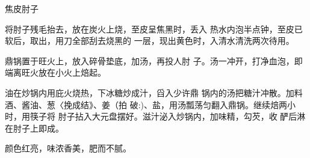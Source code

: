 \begin{recipe}{焦皮肘子}

\ingredients



\cooking

\step 将肘子残毛抬去，放在炭火上烧，至皮呈焦黑时，丢入 热水内泡半点钟，至皮已软后，取出，用刀全部刮去烧黑的 一层，现出黄色时，入清水清洗两次待用。

\step 鼎锅置于旺火上，放入碎骨垫底，加汤，再投人肘 子。汤一冲开，打净血泡，即端离旺火放在小火上焙起。

油在炒锅内用庇火烧热，下冰糖炒成汁，舀入少许鼎 锅内的汤把糖汁冲散。加料酒、酱油、葱〈挽成结》、姜（拍 破:)、盐，用汤瓢荡匀翻入鼎锅。继续焙两小时，用筷子将 肘子拈入大元盘摆好。滋汁泌入炒锅内，加味精，勾芡，收 酽后淋在肘子上即成。

\notes

颜色红亮，味浓香美，肥而不腻。

\end{recipe}

